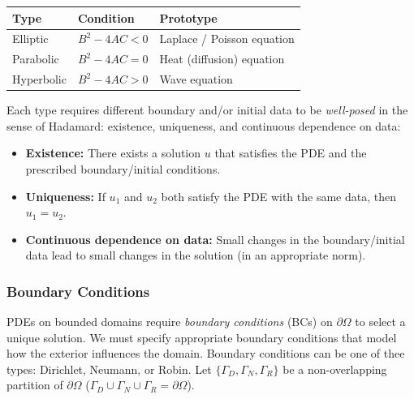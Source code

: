 \documentclass[11pt]{article}
\newcommand{\boundary}{\partial\Omega}
\begin{document}
\begin{center}
\begin{tabular}{lll}
\toprule
\textbf{Type} & \textbf{Condition} & \textbf{Prototype} \\
\midrule
Elliptic   & $B^2 - 4AC < 0$ & Laplace / Poisson equation \\
Parabolic  & $B^2 - 4AC = 0$ & Heat (diffusion) equation \\
Hyperbolic & $B^2 - 4AC > 0$ & Wave equation \\
\bottomrule
\end{tabular}
\end{center}

Each type requires different boundary and/or initial data to be
\emph{well-posed} in the sense of Hadamard: existence, uniqueness, and continuous dependence on
data:
\begin{itemize}
  \item \textbf{Existence:} There exists a solution \(u\) that satisfies the PDE and the prescribed boundary/initial conditions.
  \item \textbf{Uniqueness:} If \(u_1\) and \(u_2\) both satisfy the PDE with the same data, then \(u_1 = u_2\).
  \item \textbf{Continuous dependence on data:} Small changes in the boundary/initial data lead to small changes in the solution (in an appropriate norm).
\end{itemize}

\subsubsection{Boundary Conditions}
\label{subsubsec:bcs}

PDEs on bounded domains require \emph{boundary conditions} (BCs) on
$\boundary$ to select a unique solution.
We must specify appropriate boundary conditions that model how the exterior influences the domain.
Boundary conditions can be one of thee types: Dirichlet, Neumann, or Robin.
Let $\{\Gamma_D, \Gamma_N, \Gamma_R\}$ be a non-overlapping partition of
$\boundary$ ($\Gamma_D \cup \Gamma_N \cup \Gamma_R = \boundary$).
\end{document}
